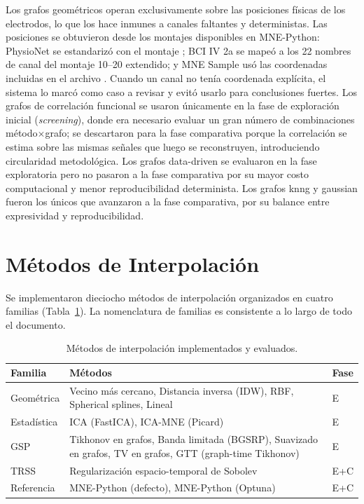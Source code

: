 Los grafos geométricos operan exclusivamente sobre las posiciones físicas de los electrodos, lo que los hace inmunes a canales faltantes y deterministas. Las posiciones se obtuvieron desde los montajes disponibles en MNE-Python: PhysioNet se estandarizó con el montaje ; BCI IV 2a se mapeó a los 22 nombres de canal del montaje 10--20 extendido; y MNE Sample usó las coordenadas incluidas en el archivo . Cuando un canal no tenía coordenada explícita, el sistema lo marcó como caso a revisar y evitó usarlo para conclusiones fuertes. Los grafos de correlación funcional se usaron únicamente en la fase de exploración inicial (\textit{screening}), donde era necesario evaluar un gran número de combinaciones método$\times$grafo; se descartaron para la fase comparativa porque la correlación se estima sobre las mismas señales que luego se reconstruyen, introduciendo circularidad metodológica. Los grafos data-driven se evaluaron en la fase exploratoria pero no pasaron a la fase comparativa por su mayor costo computacional y menor reproducibilidad determinista. Los grafos knng y gaussian fueron los únicos que avanzaron a la fase comparativa, por su balance entre expresividad y reproducibilidad.
\section{Métodos de Interpolación}
\label{sec:interpolation_methods}

Se implementaron dieciocho métodos de interpolación organizados en cuatro familias (Tabla~\ref{tab:methods}). La nomenclatura de familias es consistente a lo largo de todo el documento.

\begin{table}[htbp]
\centering
\caption{Métodos de interpolación implementados y evaluados.}
\label{tab:methods}
\small
\begin{tabular}{@{}lp{6.5cm}l@{}}
\toprule
Familia & Métodos & Fase \\
\midrule
Geométrica & Vecino más cercano, Distancia inversa (IDW), RBF, Spherical splines, Lineal & E \\
Estadística & ICA (FastICA), ICA-MNE (Picard) & E \\
GSP & Tikhonov en grafos, Banda limitada (BGSRP), Suavizado en grafos, TV en grafos, GTT (graph-time Tikhonov) & E \\
TRSS & Regularización espacio-temporal de Sobolev & E+C \\
Referencia & MNE-Python (defecto), MNE-Python (Optuna) & E+C \\
\bottomrule
\end{tabular}
\end{table}

